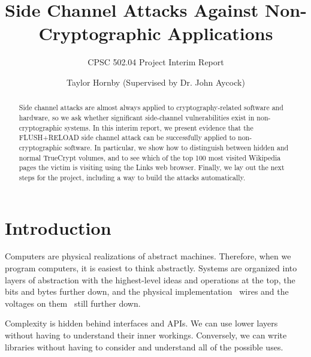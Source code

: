 \documentclass{acm_proc_article-sp}
\begin{document}
\sloppy

\title{Side Channel Attacks Against Non-Cryptographic Applications}
\subtitle{CPSC 502.04 Project Interim Report}


\author{
\alignauthor
Taylor Hornby (Supervised by Dr. John Aycock)\\
}

\maketitle

\begin{abstract}
Side channel attacks are almost always applied to cryptography-related software
and hardware, so we ask whether significant side-channel vulnerabilities exist
in non-cryptographic systems. In this interim report, we present evidence that
the FLUSH+RELOAD side channel attack can be successfully applied to
non-cryptographic software. In particular, we show how to distinguish between
hidden and normal TrueCrypt volumes, and to see which of the top 100 most
visited Wikipedia pages the victim is visiting using the Links web browser.
Finally, we lay out the next steps for the project, including a way to build the
attacks automatically.
\end{abstract}

\section{Introduction}
\label{sec:intro}

Computers are physical realizations of abstract machines. Therefore, when we
program computers, it is easiest to think abstractly. Systems are organized into
layers of abstraction with the highest-level ideas and operations at the top,
the bits and bytes further down, and the physical implementation \textendash\
wires and the voltages on them \textendash\ still further down.

Complexity is hidden behind interfaces and APIs. We can use lower layers without
having to understand their inner workings. Conversely, we can write libraries
without having to consider and understand all of the possible uses.
\end{document}

